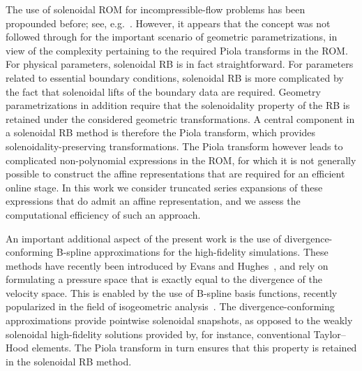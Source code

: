 \documentclass[onecolumn, twoside, a4paper, 11pt]{article}
\begin{document}
The use of solenoidal ROM for incompressible-flow problems has been propounded before;
see, e.g.~\cite{Ballarin2015ssp,Lovgren2006rbe}. However, it appears that the concept was not followed
through for the important scenario of geometric parametrizations, in view of the complexity pertaining
to the required Piola transforms in the ROM. For physical parameters, solenoidal RB is in fact
straightforward. For parameters
related to essential boundary conditions, solenoidal RB is more complicated by the fact that solenoidal
lifts of the boundary data are required. Geometry parametrizations in addition require that the
solenoidality property of the RB is retained under the considered geometric transformations. A
central component in a solenoidal RB method is therefore the Piola transform, which provides
solenoidality-preserving transformations. The Piola transform however leads to complicated
non-polynomial expressions in the ROM, for which it is not generally possible to construct
the affine representations that are required for an efficient online stage. In this work we consider
truncated series expansions of these expressions that do admit an affine representation, and
we assess the computational efficiency of such an approach.

An important additional aspect of the present work is the use of divergence-conforming B-spline
approximations for the high-fidelity simulations. These methods have recently been introduced
by Evans and Hughes~\cite{Evans2013idc1,Evans2013idc2}, and rely on formulating a pressure space that
is exactly equal to the divergence of the velocity space. This is enabled by the use of
B-spline basis functions, recently popularized in the field of isogeometric
analysis~\cite{Cottrell2009iat}. The divergence-conforming approximations provide pointwise
solenoidal snapshots, as opposed to the weakly solenoidal high-fidelity solutions provided by, for
instance, conventional Taylor--Hood elements. The Piola transform in turn ensures that this property
is retained in the solenoidal RB method.
\end{document}
